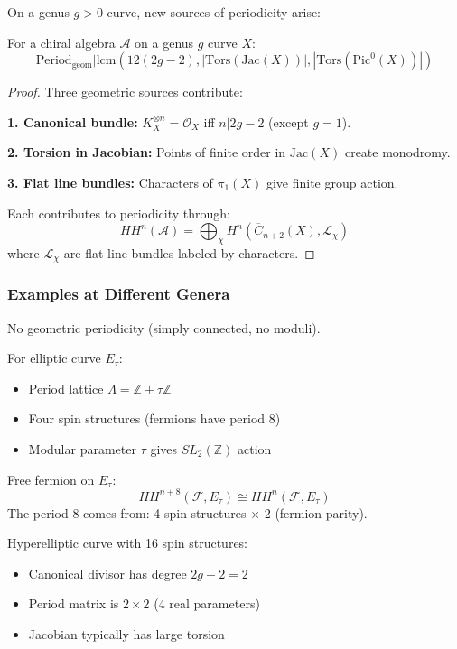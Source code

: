 On a genus $g > 0$ curve, new sources of periodicity arise:

\begin{theorem}
For a chiral algebra $\mathcal{A}$ on a genus $g$ curve $X$:
\[
\text{Period}_{\text{geom}} | \text{lcm}(12(2g-2), |\text{Tors}(\text{Jac}(X))|, |\text{Tors}(\text{Pic}^0(X))|)
\]
\end{theorem}

\begin{proof}
Three geometric sources contribute:

\textbf{1. Canonical bundle:} $K_X^{\otimes n} = \mathcal{O}_X$ iff $n | 2g-2$ (except $g=1$).

\textbf{2. Torsion in Jacobian:} Points of finite order in $\text{Jac}(X)$ create monodromy.

\textbf{3. Flat line bundles:} Characters of $\pi_1(X)$ give finite group action.

Each contributes to periodicity through:
\[
HH^n(\mathcal{A}) = \bigoplus_{\chi} H^n(\overline{C}_{n+2}(X), \mathcal{L}_{\chi})
\]
where $\mathcal{L}_{\chi}$ are flat line bundles labeled by characters.
\end{proof}

\subsubsection{Examples at Different Genera}

\begin{example}
No geometric periodicity (simply connected, no moduli).
\end{example}

\begin{example}
For elliptic curve $E_{\tau}$:
\begin{itemize}
\item Period lattice $\Lambda = \mathbb{Z} + \tau\mathbb{Z}$
\item Four spin structures (fermions have period 8)
\item Modular parameter $\tau$ gives $SL_2(\mathbb{Z})$ action
\end{itemize}

Free fermion on $E_{\tau}$:
\[
HH^{n+8}(\mathcal{F}, E_{\tau}) \cong HH^n(\mathcal{F}, E_{\tau})
\]
The period 8 comes from: 4 spin structures × 2 (fermion parity).
\end{example}

\begin{example}[Genus 2]
Hyperelliptic curve with 16 spin structures:
\begin{itemize}
\item Canonical divisor has degree $2g-2 = 2$
\item Period matrix is $2 \times 2$ (4 real parameters)
\item Jacobian typically has large torsion
\end{itemize}
\end{example}


